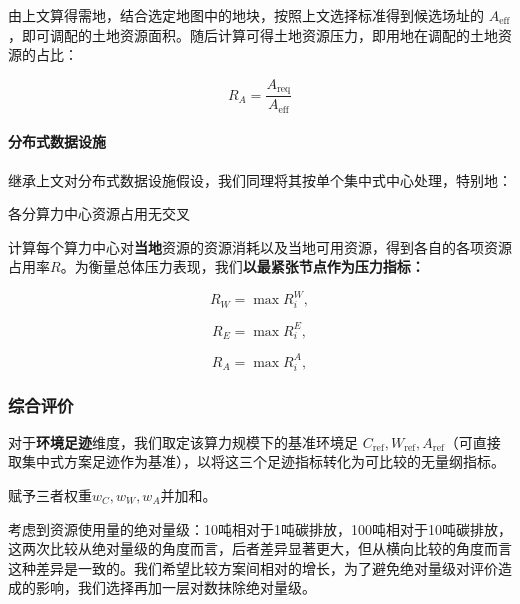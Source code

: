 
由上文算得需地，结合选定地图中的地块，按照上文选择标准得到候选场址的 $A_{\mathrm{eff}}$，即可调配的土地资源面积。随后计算可得土地资源压力，即用地在调配的土地资源的占比：

\begin{equation}\label{eq:q2-ra}
R_A=\frac{A_{\mathrm{req}}}{A_\mathrm{eff}}
\end{equation}

\paragraph{分布式数据设施}\label{sec:q2-p-dis}

继承上文对分布式数据设施假设，我们同理将其按单个集中式中心处理，特别地：

\begin{asum}\label{asum:no-cross}
各分算力中心资源占用无交叉
\end{asum}

计算每个算力中心对\textbf{当地}资源的资源消耗以及当地可用资源，得到各自的各项资源占用率$R$。为衡量总体压力表现，我们\textbf{以最紧张节点作为压力指标：}

\begin{equation}\label{eq:q2-rwmax}
R_W=\max R_i^W,
\end{equation}

\begin{equation}\label{eq:q2-remax}
R_E=\max R_i^E,
\end{equation}

\begin{equation}\label{eq:q2-ramax}
R_A=\max R_i^A,
\end{equation}

\subsubsection{综合评价}\label{sec:q2-eval}


对于\textbf{环境足迹}维度，我们取定该算力规模下的基准环境足 $C_{\mathrm{ref}},W_{\mathrm{ref}},A_{\mathrm{ref}}$（可直接取集中式方案足迹作为基准），以将这三个足迹指标转化为可比较的无量纲指标。

赋予三者权重$w_C,w_W,w_A$并加和。

考虑到资源使用量的绝对量级：10吨相对于1吨碳排放，100吨相对于10吨碳排放，这两次比较从绝对量级的角度而言，后者差异显著更大，但从横向比较的角度而言这种差异是一致的。我们希望比较方案间相对的增长，为了避免绝对量级对评价造成的影响，我们选择再加一层对数抹除绝对量级。

